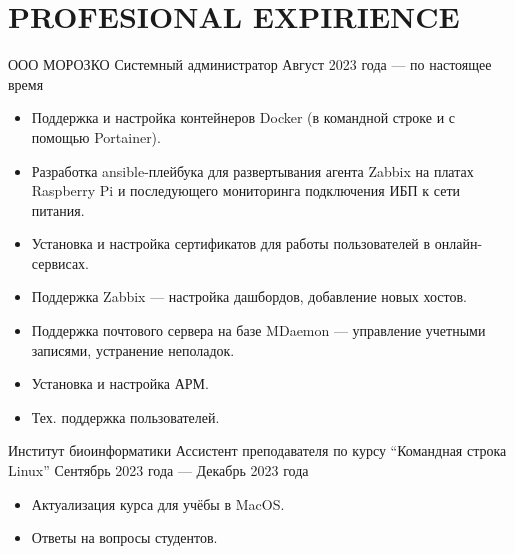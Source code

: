 \section{PROFESIONAL EXPIRIENCE}

    \job
        {ООО МОРОЗКО}
        {Системный администратор}
        {Август 2023 года --- по настоящее время}

        \begin{itemize}
            \setlength\itemsep{-.5em}
            \item Поддержка и настройка контейнеров Docker (в командной строке и с помощью Portainer).
            \item Разработка ansible-плейбука для развертывания агента Zabbix на платах Raspberry Pi и последующего мониторинга подключения ИБП к сети питания.
            \item Установка и настройка сертификатов для работы пользователей в онлайн-сервисах.
            \item Поддержка Zabbix — настройка дашбордов, добавление новых хостов.
            \item Поддержка почтового сервера на базе MDaemon — управление учетными записями, устранение неполадок.
            \item Установка и настройка АРМ.
            \item Тех. поддержка пользователей.
        \end{itemize}

        \vspace{-0.5em}
    
    \job
        {Институт биоинформатики}
        {Ассистент преподавателя по курсу “Командная строка Linux”}
        {Сентябрь 2023 года — Декабрь 2023 года}

        \begin{itemize}
            \setlength\itemsep{-.5em}
            \item Актуализация курса для учёбы в MacOS.
            \item Ответы на вопросы студентов.
        \end{itemize}

